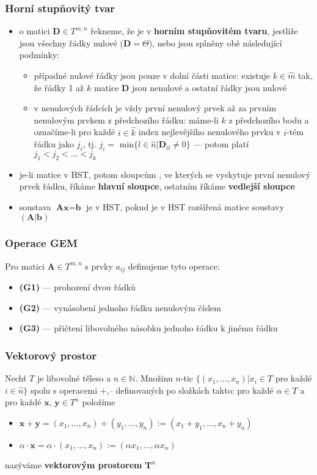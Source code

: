 \subsubsection*{Horní stupňovitý tvar}
\begin{itemize}
	\item o matici $\textbf{D} \in T^{m,n}$ řekneme, že je v \textbf{horním stupňovitém tvaru}, jestliže jsou všechny řádky nulové ($\textbf{D} = \Theta$), nebo jsou splněny obě následující podmínky:
	\begin{itemize}
		\item případné nulové řádky jsou pouze v dolní části matice: existuje $k \in \hat{m}$ tak, že řádky 1 až $k$ matice $\textbf{D}$ jsou nenulové a ostatní řádky jsou nulové
		\item v nenulových řádcích je vždy první nenulový prvek až za prvním nenulovým prvkem z předchozího řádku: máme-li $k$ z předchozího bodu a označíme-li pro každé $i \in \hat{k}$ index nejlevějšího nenulového prvku v $i$-tém řádku jako $j_i$, tj. $j_i =$ min$\{l \in \hat{n} | \textbf{D}_{il} \neq 0\}$ --- potom platí $j_1 < j_2 < ... < j_k$
	\end{itemize}
	\item je-li matice v HST, potom sloupcům , ve kterých se vyskytuje první nenulový prvek řádku, říkáme  \textbf{hlavní sloupce}, ostatním říkáme \textbf{vedlejší sloupce}
	\item soustava $\textbf{Ax} = \textbf{b}$ je v HST, pokud je v HST rozšířená matice soustavy $(\textbf{A} | \textbf{b})$
\end{itemize}

\subsubsection*{Operace GEM}
Pro matici $\textbf{A} \in T^{m,n}$ s prvky $a_{ij}$ definujeme tyto operace:
\begin{itemize}
	\item \textbf{(G1)} --- prohození dvou řádků
	\item \textbf{(G2)} --- vynásobení jednoho řádku nenulovým číslem
	\item \textbf{(G3)} --- přičtení libovolného násobku jednoho řádku k jinému řádku
\end{itemize}

\subsubsection*{Vektorový prostor}
Nechť $T$ je libovolné těleso a $n \in \mathbb{N}$. Množinu $n$-tic $\{(x_1,...,x_n) | x_i \in T$ pro každé $i \in \hat{n}\}$ spolu s operacemi $+, \cdot$ definovaných po složkách takto: pro každé $\alpha \in T$ a pro každé $\textbf{x, y} \in T^n$ položíme
	\begin{itemize}
		\item $\textbf{x} + \textbf{y} = (x_1,...,x_n) + (y_1,...,y_n) := (x_1 + y_1,...,x_n + y_n)$
		\item $\alpha \cdot \textbf{x} = \alpha \cdot (x_1,...,x_n) := (\alpha x_1,...,\alpha x_n)$
	\end{itemize}
nazýváme \textbf{vektorovým prostorem} $\textbf{T}^n$

